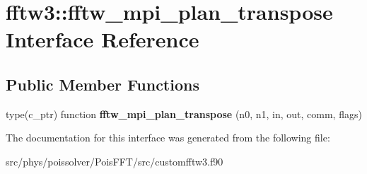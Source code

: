 \hypertarget{interfacefftw3_1_1fftw__mpi__plan__transpose}{}\section{fftw3\+:\+:fftw\+\_\+mpi\+\_\+plan\+\_\+transpose Interface Reference}
\label{interfacefftw3_1_1fftw__mpi__plan__transpose}
\subsection*{Public Member Functions}
\begin{DoxyCompactItemize}
\item 
type(c\+\_\+ptr) function {\bfseries fftw\+\_\+mpi\+\_\+plan\+\_\+transpose} (n0, n1, in, out, comm, flags)\hypertarget{interfacefftw3_1_1fftw__mpi__plan__transpose_a37a8c1080c176fcfa4924d61f91f7273}{}\label{interfacefftw3_1_1fftw__mpi__plan__transpose_a37a8c1080c176fcfa4924d61f91f7273}

\end{DoxyCompactItemize}


The documentation for this interface was generated from the following file\+:\begin{DoxyCompactItemize}
\item 
src/phys/poissolver/\+Pois\+F\+F\+T/src/customfftw3.\+f90\end{DoxyCompactItemize}
